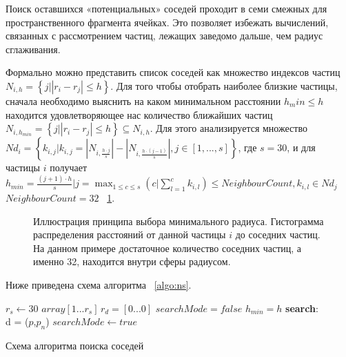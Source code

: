 Поиск оставшихся «потенциальных» соседей проходит в семи смежных для пространственного фрагмента ячейках. Это позволяет избежать вычислений, связанных с рассмотрением частиц, лежащих заведомо дальше, чем радиус сглаживания.

Формально можно представить список соседей как множество индексов частиц \(N_{i,h}=\left \{ j|\left | r_i-r_j \right | \leqslant h \right \}\). Для того чтобы отобрать наиболее близкие частицы, сначала необходимо выяснить на каком минимальном расстоянии \(h_min \leq  h\) находится удовлетворяющее нас количество ближайших частиц \(N_{i,h_{min}}=\left \{ j|\left | r_i-r_j \right | \leqslant h \right\} \subseteq N_{i,h}\). Для этого анализируется множество \(Nd_i=\left \{ k_{i,j}|k_{i,j}=\left | N_{i,\frac{h\cdot j}{s}} \right | - \left | N_{i,\frac{h\cdot (j-1)}{s}} \right |, j\in [1,...,s] \right \}\), где \(s=30\), и для частицы \(i\) получает \(h_{min}=\frac{(j+1)\cdot h}{s} |  j = \max_{1\leq c\leq s}\left ( c|\sum_{l=1}^{c} k_{i,l} \right )\leq NeighbourCount, k_{i,l} \in Nd_j\) \(NeighbourCount=32\) ~\ref{fig:ns_5}.
\begin{figure}[ht]
  \centerfloat{
    \texttt{[image: ns\_5]}
  }
  \caption{Иллюстрация принципа выбора минимального радиуса. Гистограмма распределения расстояний от данной частицы \(i\) до соседних частиц. На данном примере достаточное количество соседних частиц, а именно 32, находится внутри сферы радиусом.}
  \label{fig:ns_5}
\end{figure}
Ниже приведена схема алгоритма ~\ref{algo:ns}.

\begin{algorithm}[H]
  \label{algo:ns}
  \SetAlgoLined
  {
    $r_s  \leftarrow 30 $\;
    $array[1...r_s]\, r_d = [0...0]$\;
    $searchMode = false$\;
    $h_{min} = h$\;
    \textbf{search}: \\
    {
      {
        d = \Dist($p$,$p_{n}$)\;
      }
      $searchMode \leftarrow true$\;
    }
  }
  \caption{Схема алгоритма поиска соседей}
\end{algorithm}


